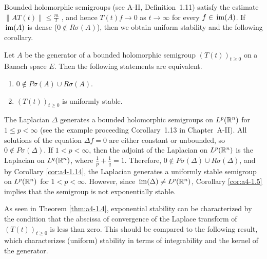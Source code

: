Bounded holomorphic semigroups (see A-II, Definition~1.11) satisfy the estimate
$\|AT(t)\| \leq \frac{m}{t}$ \citet[p.33]{goldstein:1985a}, and hence $T(t)f \to 0$ as $t \to \infty$
for every $f \in \mathop{}\mathrm{im}(A)$. 
If $\mathop{}\mathrm{im}(A)$ is dense (\ie $0 \not\in R\sigma(A)$), then we obtain
uniform stability and the following corollary.
\begin{corollary}\label{cor:a4-1.14}
Let $A$ be the generator of a bounded holomorphic
semigroup $(T(t))_{t \geq 0}$ on a Banach space $E$. 
Then the following statements are equivalent.
\begin{enumerate}[\upshape (a)]
\item 
$0 \not\in P\sigma(A) \cup R\sigma(A)$.

\item 
$(T(t))_{t \geq 0}$ is uniformly stable.

\end{enumerate}
\end{corollary}
\begin{example}\label{ex:a4-15}
The Laplacian $\Delta$ generates a bounded holomorphic semigroups on $L^{p}(\mathbb{R}^{n})$ for $1 \leq p < \infty$ (see the example proceeding
Corollary~1.13 in Chapter~A-II). 
All solutions of the equation $\Delta f = 0$ are either constant
or unbounded, so $0 \not\in P\sigma(\Delta)$. 
If $1 < p < \infty$, then the adjoint
of the Laplacian on $L^{p}(\mathbb{R}^{n})$ is the Laplacian on $L^{q}(\mathbb{R}^{n})$, where
$\frac{1}{p} + \frac{1}{q} = 1$. 
Therefore, $0 \not\in P\sigma(\Delta) \cup R\sigma(\Delta)$, and by Corollary \ref{cor:a4-1.14},
the Laplacian generates a uniformly stable semigroup on  $L^{p}(\mathbb{R}^{n})$
for $1 < p < \infty$. However, since $\mathop{}\mathrm{im}( \Delta) \not= L^{p}(\mathbb{R}^{n})$, Corollary \ref{cor:a4-1.5} implies that the semigroup is not exponentially stable. %
\end{example}
As seen in Theorem \ref{thm:a4-1.4}, exponential stability can be characterized by the condition that the abscissa of convergence of the Laplace transform of $(T(t))_{t \geq 0}$ is less than zero. 
This should be compared to the following result, which characterizes (uniform) stability in terms of integrability and the kernel of the generator.
